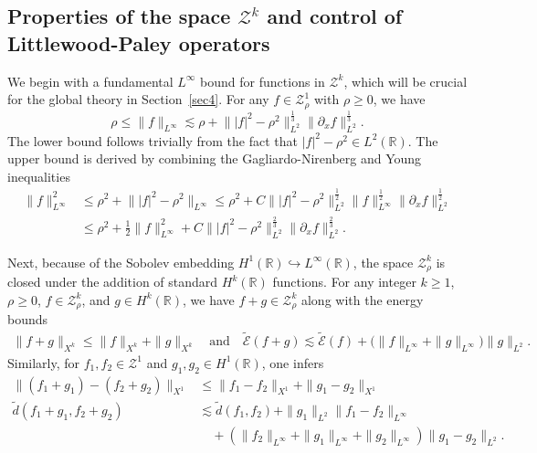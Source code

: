 \documentclass{amsart}
\numberwithin{equation}{section}
\newcommand{\R}{\mathbb{R}}
\begin{document}

\subsection{Properties of the space \texorpdfstring{$\mathcal{Z}^k$}{Z[k]} and control of Littlewood-Paley operators}
\label{subsec:Zk}

We begin with a fundamental $L^\infty$ bound for functions in $\mathcal{Z}^k$, which will be crucial for the global theory in Section~\ref{sec4}. For any $f\in \mathcal{Z}^1_\rho$ with $\rho\geq 0$, we have
\begin{equation}\label{est:Linfty}
\rho \leq \| f\|_{L^\infty} \lesssim \rho+\big\| |f|^2-\rho^2\big\|_{L^2}^{\frac13}\|\partial_xf\|_{L^2}^{\frac13}.
\end{equation}
The lower bound follows trivially from the fact that $|f|^{2}-\rho^{2} \in L^{2}(\mathbb{R})$. The upper bound is derived by combining the Gagliardo-Nirenberg and Young inequalities
\[ \begin{aligned}
\| f\|_{L^\infty}^2&\leq \rho^2+\big\| |f|^2-\rho^2\big\|_{L^\infty} \leq \rho^2+C\big\| |f|^2-\rho^2\big\|_{L^2}^{\frac12}\| f\|_{L^\infty}^{\frac12}\| \partial_xf\|_{L^2}^{\frac12} \\
&\leq \rho^2+\frac12\| f\|_{L^\infty}^2+C\big\| |f|^2-\rho^2\big\|_{L^2}^{\frac23}\| \partial_xf\|_{L^2}^{\frac23}. \end{aligned} \]

Next, because of the Sobolev embedding $H^1(\R)\hookrightarrow L^\infty(\R)$, the space $\mathcal{Z}^k_\rho$ is closed under the addition of standard $H^k(\R)$ functions. For any integer $k\geq 1$, $\rho\geq 0$, $f\in \mathcal{Z}^k_\rho$, and $g\in H^k(\R)$, we have $f+g\in \mathcal{Z}^k_\rho$ along with the energy bounds
\begin{equation}\label{est:Ekf+g}
\begin{aligned}
\| f+g\|_{X^k}\leq \| f\|_{X^k}+\| g\|_{X^k} \quad \text{and} \quad
\widetilde{\mathcal{E}}(f+g)\lesssim \widetilde{\mathcal{E}}(f)+\big( \| f\|_{L^\infty}+\| g\|_{L^\infty}\big) \| g\|_{L^2}.
\end{aligned}
\end{equation}
Similarly, for  $f_1, f_2 \in \mathcal{Z}^1$  and $g_1, g_2 \in H^1(\R)$, one infers
\begin{equation}\label{est:d1f+g}
\begin{aligned}
\| (f_1+g_1)-(f_2+g_2)\|_{X^1}&\leq \| f_1-f_2\|_{X^1}+\| g_1-g_2\|_{X^1} \\
\widetilde{d}(f_1+g_1,f_2+g_2)&\lesssim \widetilde{d}(f_1,f_2)+\| g_1\|_{L^2}\| f_1-f_2\|_{L^\infty}\\
&\quad +(\| f_2\|_{L^\infty}+\| g_1\|_{L^\infty}+\| g_2\|_{L^\infty})\| g_1-g_2\|_{L^2}.
\end{aligned}
\end{equation}
\end{document}
